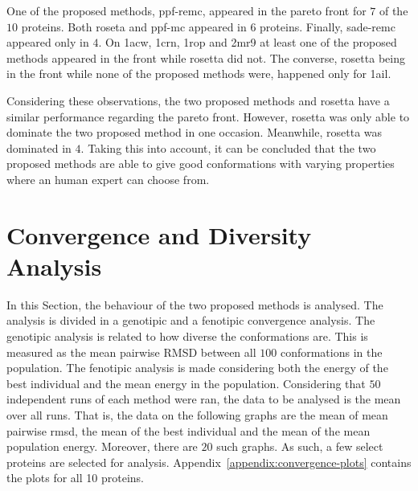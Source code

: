 One of the proposed methods, ppf-remc, appeared in the pareto front for $7$ of
the $10$ proteins. Both roseta and ppf-mc appeared in $6$ proteins. Finally,
sade-remc appeared only in $4$. On 1acw, 1crn, 1rop and 2mr9 at least one of the
proposed methods appeared in the front while rosetta did not. The converse,
rosetta being in the front while none of the proposed methods were, happened
only for 1ail.

Considering these observations, the two proposed methods and rosetta have a
similar performance regarding the pareto front. However, rosetta was only
able to dominate the two proposed method in one occasion. Meanwhile, rosetta was
dominated in $4$. Taking this into account, it can be concluded that the two
proposed methods are able to give good conformations with varying properties
where an human expert can choose from.

\section{Convergence and Diversity Analysis}
\label{sec:convergence-analysis}

In this Section, the behaviour of the two proposed methods is analysed. The
analysis is divided in a genotipic and a fenotipic convergence analysis. The
genotipic analysis is related to how diverse the conformations are. This is
measured as the mean pairwise RMSD between all $100$ conformations in the
population. The fenotipic analysis is made considering both the energy of
the best individual and the mean energy in the population. Considering that
$50$ independent runs of each method were ran, the data to be analysed is
the mean over all runs. That is, the data on the following graphs are
the mean of mean pairwise rmsd, the mean of the best individual and the mean
of the mean population energy. Moreover, there are $20$ such graphs. As such,
a few select proteins are selected for analysis.
Appendix~\ref{appendix:convergence-plots} contains the plots for all 10
proteins.

